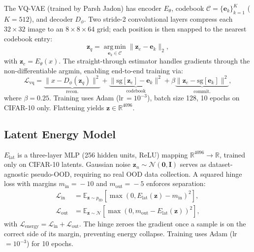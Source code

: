\documentclass[10pt,twocolumn,letterpaper]{article}
\begin{document}
The VQ-VAE (trained by Parsh Jadon) has encoder $E_\theta$,
codebook $\mathcal{C}=\{\mathbf{e}_k\}_{k=1}^{K}$
($K\!=\!512$), and decoder $D_\phi$.
Two stride-2 convolutional layers compress each
$32{\times}32$ image to an $8{\times}8{\times}64$ grid;
each position is then snapped to the nearest codebook entry:
\begin{equation}
  \mathbf{z}_q = \operatorname*{arg\,min}_{\mathbf{e}_k\in\mathcal{C}}
    \|\mathbf{z}_e-\mathbf{e}_k\|_2,   \label{eq:quant}
\end{equation}
with $\mathbf{z}_e\!=\!E_\theta(x)$.
The straight-through estimator handles gradients through
the non-differentiable argmin, enabling end-to-end
training via:
\begin{equation}
  \mathcal{L}_{\mathrm{vq}} =
  \underbrace{\|x{-}D_\phi(\mathbf{z}_q)\|^2}_{\text{recon.}}
  +\underbrace{\|\mathrm{sg}[\mathbf{z}_e]{-}\mathbf{e}_k\|^2}_{\text{codebook}}
  +\beta\underbrace{\|\mathbf{z}_e{-}\mathrm{sg}[\mathbf{e}_k]\|^2}_{\text{commit.}},
  \label{eq:vqloss}
\end{equation}
where $\beta\!=\!0.25$.
Training uses Adam (lr\,$=\!10^{-3}$), batch size 128,
10 epochs on CIFAR-10 only.
Flattening yields $\mathbf{z}\!\in\!\mathbb{R}^{4096}$.

\subsection{Latent Energy Model}

$E_{\mathrm{lat}}$ is a three-layer MLP (256 hidden units,
ReLU) mapping $\mathbb{R}^{4096}\!\to\!\mathbb{R}$, trained
only on CIFAR-10 latents.
Gaussian noise $\mathbf{z}_n\!\sim\!\mathcal{N}(\mathbf{0},\mathbf{I})$
serves as dataset-agnostic pseudo-OOD, requiring no real
OOD data collection.
A squared hinge loss with margins $m_{\mathrm{in}}\!=\!-10$
and $m_{\mathrm{out}}\!=\!-5$ enforces separation:
\begin{align}
  \mathcal{L}_{\mathrm{in}} &=
    \mathbb{E}_{\mathbf{z}\sim p_\mathrm{ID}}\!
    [\max(0,E_{\mathrm{lat}}(\mathbf{z})-m_{\mathrm{in}})^2],
    \label{eq:lin}\\
  \mathcal{L}_{\mathrm{out}} &=
    \mathbb{E}_{\mathbf{z}\sim\mathcal{N}}\!
    [\max(0,m_{\mathrm{out}}-E_{\mathrm{lat}}(\mathbf{z}))^2],
    \label{eq:lout}
\end{align}
with $\mathcal{L}_{\mathrm{energy}}=\mathcal{L}_{\mathrm{in}}+\mathcal{L}_{\mathrm{out}}$.
The hinge zeroes the gradient once a sample is on the
correct side of its margin, preventing energy collapse.
Training uses Adam (lr\,$=\!10^{-3}$) for 10 epochs.
\end{document}
